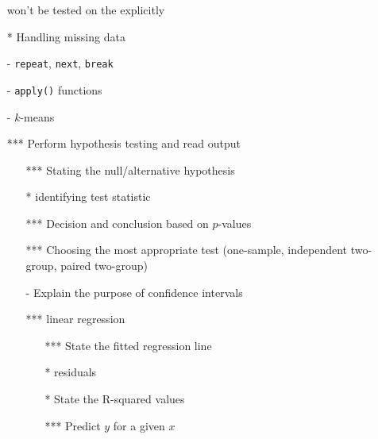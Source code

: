 \documentclass[12pt]{article}%
\begin{document}
\begin{itemize}
won't be tested on the explicitly 
\item[*] Handling missing data
\item[-] {\tt repeat}, {\tt next}, {\tt break}
\item[-] {\tt apply()} functions
\item[-] $k$-means
\item[***] Perform hypothesis testing and read output 
\begin{itemize}
\item[***] Stating the null/alternative hypothesis
\item[*] identifying  test statistic 
\item[***] Decision and conclusion based on $p$-values
\item[***] Choosing the most appropriate test (one-sample, independent two-group, paired two-group)
\item[-] Explain the purpose of confidence intervals
\item[***] linear regression
\begin{itemize}
\item[***] State the fitted regression line
\item[*] residuals
\item[*] State the {\sf R}-squared values 
\item[***] Predict $y$ for a given $x$
\end{itemize}
\end{itemize}

\end{itemize}
\end{document}
